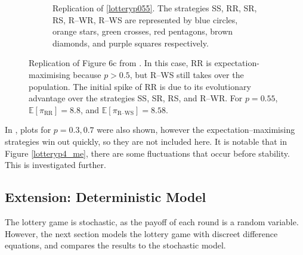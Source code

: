 \begin{figure}[!h]
\begin{subfigure}[b]{0.45\textwidth}
    \caption{Replication of \ref{lotteryp055}. The strategies SS, RR, SR, RS, R--WR, R--WS are represented by blue circles, orange stars, green crosses, red pentagons, brown diamonds, and purple squares respectively. }
    \label{lotteryp4_me_2}
  \end{subfigure}
  \caption{Replication of Figure 6c from \cite{RN30}. In this case, RR is expectation-maximising because $p>0.5$, but R--WS still takes over the population. The initial spike of RR is due to its evolutionary advantage over the strategies SS, SR, RS, and R--WR.  For $p=0.55$, $\mathbb E [\pi_{\text{RR}}] = 8.8$, and $\mathbb E [\pi_{\text{R--WS}}] =8.58 $.} \label{lottery_comp5}
\end{figure} 
\FloatBarrier
In \cite{RN30}, plots for $p=0.3, 0.7$ were also shown, however the expectation--maximising strategies win out quickly, so they are not included here. It is notable that in Figure \ref{lotteryp4_me}, there are some fluctuations that occur before stability. This is investigated further.
\subsection{Extension: Deterministic Model}
The lottery game is stochastic, as the payoff of each round is a random variable. However, the next section models the lottery game with discreet difference equations, and compares the results to the stochastic model. \\

